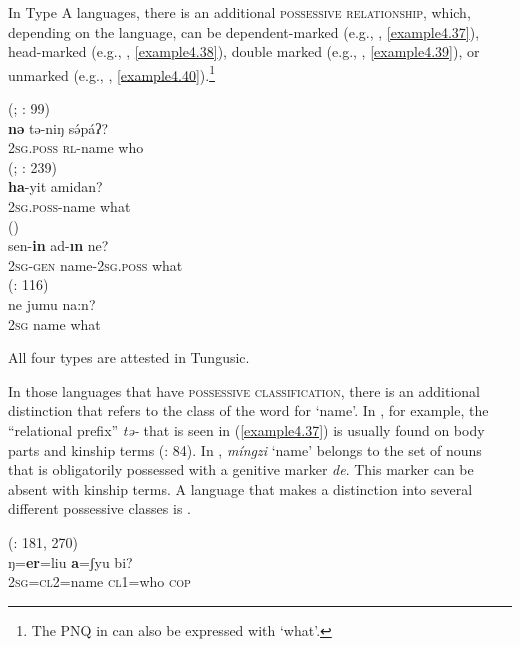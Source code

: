\documentclass[output=paper,colorlinks,citecolor=brown]{langscibook}
\begin{document}
In Type A languages, there is an additional \textsc{possessive relationship}, which, depending on the language, can be dependent-marked (e.g., , \ref{example4.37}), head-marked (e.g., , \ref{example4.38}), double marked (e.g., , \ref{example4.39}), or unmarked (e.g., , \ref{example4.40}).\footnote{The PNQ in  can also be expressed with ‘what’.}

\ea
    \label{example4.37}
     (; \citealt{Coupe2007}: 99)\\
    \gll \textbf{nə}			tə-niŋ		sə́páʔ?\\
    2\textsc{sg.poss}		\textsc{rl}-name		who\\
\ex
    \label{example4.38}
     (; \citealt{Klamer2010}: 239)\\
    \gll \textbf{ha}-yit			amidan?\\
    2\textsc{sg.poss}-name		what\\
\ex
    \label{example4.39}
     ()\\
    \gll sen-\textbf{in}		ad-\textbf{ın}			ne?\\
    2\textsc{sg-gen}		name-2\textsc{sg.poss}		what\\
\ex
    \label{example4.40}
     (\citealt{Nagaraja2014}: 116)\\
    \gll ne			jumu	na:n?\\
    2\textsc{sg}		name	what\\
\z


\noindent All four types are attested in Tungusic.

In those languages that have \textsc{possessive classification}, there is an additional distinction that refers to the class of the word for ‘name’. In , for example, the “relational prefix” \textit{tə-} that is seen in (\ref{example4.37}) is usually found on body parts and kinship terms (\citealt{Coupe2007}: 84). In , \textit{míngzi} ‘name’ belongs to the set of nouns that is obligatorily possessed with a genitive marker \textit{de}. This marker can be absent with kinship terms. A language that makes a distinction into several different possessive classes is .

\ea
    \label{example4.41}
     (\citealt{Abbi2013}: 181, 270)\\
    \gll ŋ=\textbf{er}=liu			\textbf{a}=ʃyu		bi?\\
    2\textsc{sg=cl2}=name	\textsc{cl}1=who		\textsc{cop}\\
    \z
\end{document}
